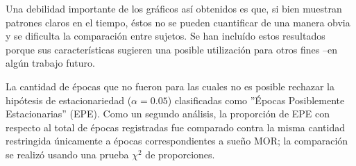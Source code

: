 Una debilidad importante de los gr\'aficos as\'i obtenidos es que, si bien muestran patrones 
claros en el tiempo, \'estos no se pueden cuantificar de una manera obvia y se dificulta la
comparaci\'on entre sujetos. Se han inclu\'ido estos resultados porque sus caracter\'isticas 
sugieren una posible utilizaci\'on para otros fines --en alg\'un trabajo futuro.

La cantidad de \'epocas que no fueron para las cuales no es posible rechazar la hip\'otesis de
estacionariedad ($\alpha=0.05$)
clasificadas como ''\'Epocas Posiblemente Estacionarias'' (EPE).
Como un segundo an\'alisis,
la proporci\'on de EPE con respecto al total de \'epocas registradas fue comparado contra la misma
cantidad restringida \'unicamente a \'epocas correspondientes a sue\~no MOR; la comparaci\'on 
se realiz\'o usando una prueba $\chi^{2}$ de proporciones.



